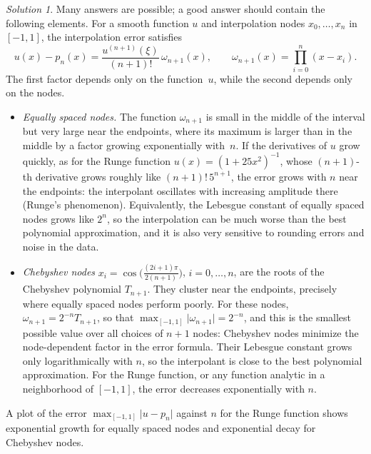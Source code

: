 \documentclass[10pt]{article}
\theoremstyle{definition}
\theoremstyle{remark}
\newtheorem*{protosolution}{Solution}
\newenvironment{solutionframe}
{%
    \begin{mdframed}[
        leftmargin=1cm,
        skipabove=.3cm,
        linecolor=blue,
        backgroundcolor=lightgreen,
        linewidth=0pt,
        innerleftmargin=.5em,
        innerrightmargin=.5em,
        innertopmargin=.3em,
        innerbottommargin=.6em,
    ]
}
{
    \end{mdframed}
}
\newenvironment{solution}
{\pushQED{\qed}\renewcommand{\qedsymbol}{$\triangle$}
\begin{solutionframe}\small \begin{protosolution}}
{\popQED\end{protosolution}\end{solutionframe}}
\begin{document}
\begin{solution}
    Many answers are possible; a good answer should contain the following elements.
    For a smooth function $u$ and interpolation nodes $x_0, \dotsc, x_n$ in $[-1, 1]$,
    the interpolation error satisfies
    \[
        u(x) - p_n(x) = \frac{u^{(n+1)}(\xi)}{(n+1)!} \, \omega_{n+1}(x),
        \qquad
        \omega_{n+1}(x) = \prod_{i=0}^{n} (x - x_i).
    \]
    The first factor depends only on the function~$u$,
    while the second depends only on the nodes.
    \begin{itemize}
        \item
            \emph{Equally spaced nodes.}
            The function $\omega_{n+1}$ is small in the middle of the interval but very large near the endpoints,
            where its maximum is larger than in the middle by a factor growing exponentially with~$n$.
            If the derivatives of $u$ grow quickly,
            as for the Runge function $u(x) = (1 + 25 x^2)^{-1}$,
            whose $(n+1)$-th derivative grows roughly like $(n+1)! \, 5^{n+1}$,
            the error grows with $n$ near the endpoints:
            the interpolant oscillates with increasing amplitude there (Runge's phenomenon).
            Equivalently, the Lebesgue constant of equally spaced nodes grows like $2^n$,
            so the interpolation can be much worse than the best polynomial approximation,
            and it is also very sensitive to rounding errors and noise in the data.

        \item
            \emph{Chebyshev nodes}
            $x_i = \cos\bigl(\frac{(2i+1)\pi}{2(n+1)}\bigr)$, $i = 0, \dotsc, n$,
            are the roots of the Chebyshev polynomial $T_{n+1}$.
            They cluster near the endpoints,
            precisely where equally spaced nodes perform poorly.
            For these nodes, $\omega_{n+1} = 2^{-n} T_{n+1}$,
            so that $\max_{[-1, 1]} \lvert \omega_{n+1} \rvert = 2^{-n}$,
            and this is the smallest possible value over all choices of $n+1$ nodes:
            Chebyshev nodes minimize the node-dependent factor in the error formula.
            Their Lebesgue constant grows only logarithmically with $n$,
            so the interpolant is close to the best polynomial approximation.
            For the Runge function, or any function analytic in a neighborhood of $[-1, 1]$,
            the error decreases exponentially with $n$.
    \end{itemize}
    A plot of the error $\max_{[-1, 1]} \lvert u - p_n \rvert$ against $n$ for the Runge function
    shows exponential growth for equally spaced nodes and exponential decay for Chebyshev nodes.
\end{solution}
\end{document}
